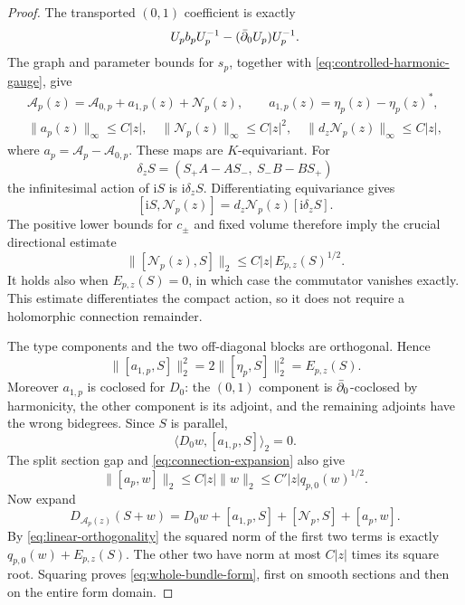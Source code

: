 \begin{proof}
The transported $(0,1)$ coefficient is exactly
\[
 U_p b_p U_p^{-1}-(\bar\partial_0U_p)U_p^{-1}.
\]
The graph and parameter bounds for $s_p$, together with
\eqref{eq:controlled-harmonic-gauge}, give
\begin{equation}\label{eq:connection-expansion}
 \begin{gathered}
 \mathcal A_p(z)=\mathcal A_{0,p}+a_{1,p}(z)+\mathcal N_p(z),
 \qquad a_{1,p}(z)=\eta_p(z)-\eta_p(z)^*,\\
 \|a_p(z)\|_\infty\le C|z|,
 \quad\|\mathcal N_p(z)\|_\infty\le C|z|^2,
 \quad\|d_z\mathcal N_p(z)\|_\infty\le C|z|,
 \end{gathered}
\end{equation}
where $a_p=\mathcal A_p-\mathcal A_{0,p}$.
These maps are $K$-equivariant. For
\[
 \delta_zS=(S_+A-AS_-,\ S_-B-BS_+)
\]
the infinitesimal action of $\mathrm iS$ is
$\mathrm i\delta_zS$. Differentiating equivariance gives
\[
 [\mathrm iS,\mathcal N_p(z)]
             =d_z\mathcal N_p(z)[\mathrm i\delta_zS].
\]
The positive lower bounds for $c_\pm$ and fixed volume
therefore imply the crucial directional estimate
\begin{equation}\label{eq:relative-commutator}
 \|[\mathcal N_p(z),S]\|_2
                         \le C|z|\,E_{p,z}(S)^{1/2}.
\end{equation}
It holds also when $E_{p,z}(S)=0$, in which case the
commutator vanishes exactly. This estimate differentiates
the compact action, so it does not require a holomorphic
connection remainder.

The type components and the two off-diagonal blocks are
orthogonal. Hence
\[
 \|[a_{1,p},S]\|_2^2
          =2\|[\eta_p,S]\|_2^2=E_{p,z}(S).
\]
Moreover $a_{1,p}$ is coclosed for $D_0$: the $(0,1)$
component is $\bar\partial_0$-coclosed by harmonicity, the other
component is its adjoint, and the remaining adjoints have
the wrong bidegrees. Since $S$ is parallel,
\begin{equation}\label{eq:linear-orthogonality}
       \langle D_0w,[a_{1,p},S]\rangle_2=0.
\end{equation}
The split section gap and \eqref{eq:connection-expansion}
also give
\[
 \|[a_p,w]\|_2\le C|z|\|w\|_2
                         \le C'|z|q_{p,0}(w)^{1/2}.
\]
Now expand
\[
 D_{\mathcal A_p(z)}(S+w)
     =D_0w+[a_{1,p},S]+[\mathcal N_p,S]+[a_p,w].
\]
By \eqref{eq:linear-orthogonality} the squared norm of
the first two terms is exactly $q_{p,0}(w)+E_{p,z}(S)$.
The other two have norm at most $C|z|$ times its square
root. Squaring proves \eqref{eq:whole-bundle-form}, first
on smooth sections and then on the entire form domain.


\end{proof}
